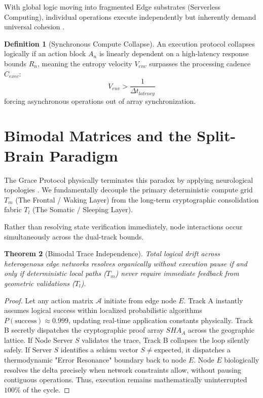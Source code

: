 \documentclass[12pt, a4paper]{article}
\theoremstyle{plain}
\newtheorem{theorem}{Theorem}[section]
\theoremstyle{definition}
\newtheorem{definition}[theorem]{Definition}
\begin{document}
With global logic moving into fragmented Edge substrates (Serverless Computing), individual operations execute independently but inherently demand universal cohesion \cite{hellerstein2018serverless}. 

\begin{definition}[Synchronous Compute Collapse]
An execution protocol collapses logically if an action block $A_n$ is linearly dependent on a high-latency response bounds $R_n$, meaning the entropy velocity $V_{env}$ surpasses the processing cadence $C_{exec}$:
\begin{equation}
    V_{env} > \frac{1}{\Delta t_{latency}}
\end{equation}
forcing asynchronous operations out of array synchronization.
\end{definition}

\section{Bimodal Matrices and the Split-Brain Paradigm}
The Grace Protocol physically terminates this paradox by applying neurological topologies \cite{gazzaniga2005forty}. We fundamentally decouple the primary deterministic compute grid $T_m$ (The Frontal / Waking Layer) from the long-term cryptographic consolidation fabric $T_l$ (The Somatic / Sleeping Layer).

Rather than resolving state verification immediately, node interactions occur simultaneously across the dual-track bounds.

\begin{theorem}[Bimodal Trace Independence]
Total logical drift across heterogenous edge networks resolves organically without execution pause if and only if deterministic local paths ($T_m$) never require immediate feedback from geometric validations ($T_l$).
\end{theorem}
\begin{proof}
Let any action matrix $\mathcal{A}$ initiate from edge node $E$. 
Track A instantly assumes logical success within localized probabilistic algorithms $P(\text{success}) \approx 0.999$, updating real-time application constants physically.
Track B secretly dispatches the cryptographic proof array $SHA_{A}$ across the geographic lattice.
If Node Server $S$ validates the trace, Track B collapses the loop silently safely. If Server $S$ identifies a schism vector $S \neq \text{expected}$, it dispatches a thermodynamic "Error Resonance" boundary back to node $E$. Node $E$ biologically resolves the delta precisely when network constraints allow, without pausing contiguous operations. Thus, execution remains mathematically uninterrupted $100\%$ of the cycle.
\end{proof}
\end{document}

